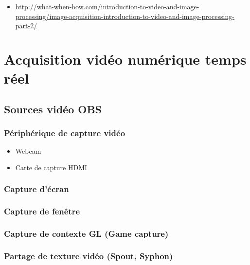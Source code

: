 \documentclass[
  french,
]{book}
\providecommand{\tightlist}{%
  \setlength{\itemsep}{0pt}\setlength{\parskip}{0pt}}
\begin{document}
\begin{itemize}
\tightlist
\item
  \url{http://what-when-how.com/introduction-to-video-and-image-processing/image-acquisition-introduction-to-video-and-image-processing-part-2/}
\end{itemize}

\hypertarget{acquerir_captation}{%
\section{Acquisition vidéo numérique temps réel}\label{acquerir_captation}}

\hypertarget{sources-viduxe9o-obs}{%
\subsection{Sources vidéo OBS}\label{sources-viduxe9o-obs}}

\hypertarget{puxe9riphuxe9rique-de-capture-viduxe9o}{%
\subsubsection{Périphérique de capture vidéo}\label{puxe9riphuxe9rique-de-capture-viduxe9o}}

\begin{itemize}
\tightlist
\item
  Webcam
\item
  Carte de capture HDMI
\end{itemize}

\hypertarget{capture-duxe9cran}{%
\subsubsection{Capture d'écran}\label{capture-duxe9cran}}

\hypertarget{capture-de-fenuxeatre}{%
\subsubsection{Capture de fenêtre}\label{capture-de-fenuxeatre}}

\hypertarget{capture-de-contexte-gl-game-capture}{%
\subsubsection{Capture de contexte GL (Game capture)}\label{capture-de-contexte-gl-game-capture}}

\hypertarget{partage-de-texture-viduxe9o-spout-syphon}{%
\subsubsection{Partage de texture vidéo (Spout, Syphon)}\label{partage-de-texture-viduxe9o-spout-syphon}}
\end{document}
